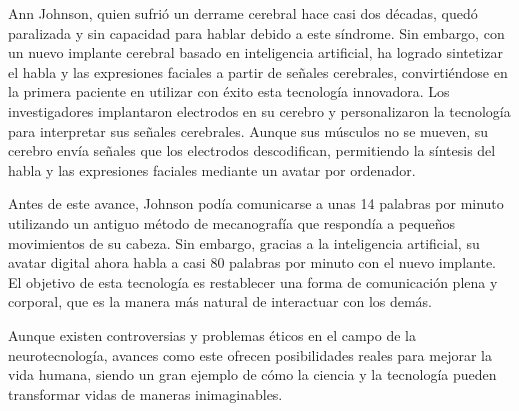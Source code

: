  Ann Johnson, quien sufrió un derrame cerebral hace casi dos décadas, quedó paralizada y sin capacidad para hablar debido a este síndrome. Sin embargo, con un nuevo implante cerebral basado en inteligencia artificial, ha logrado sintetizar el habla y las expresiones faciales a partir de señales cerebrales, convirtiéndose en la primera paciente en utilizar con éxito esta tecnología innovadora. Los investigadores implantaron electrodos en su cerebro y personalizaron la tecnología para interpretar sus señales cerebrales. Aunque sus músculos no se mueven, su cerebro envía señales que los electrodos descodifican, permitiendo la síntesis del habla y las expresiones faciales mediante un avatar por ordenador.

Antes de este avance, Johnson podía comunicarse a unas 14 palabras por minuto utilizando un antiguo método de mecanografía que respondía a pequeños movimientos de su cabeza. Sin embargo, gracias a la inteligencia artificial, su avatar digital ahora habla a casi 80 palabras por minuto con el nuevo implante. El objetivo de esta tecnología es restablecer una forma de comunicación plena y corporal, que es la manera más natural de interactuar con los demás.

Aunque existen controversias y problemas éticos en el campo de la neurotecnología, avances como este ofrecen posibilidades reales para mejorar la vida humana, siendo un gran ejemplo de cómo la ciencia y la tecnología pueden transformar vidas de maneras inimaginables.
